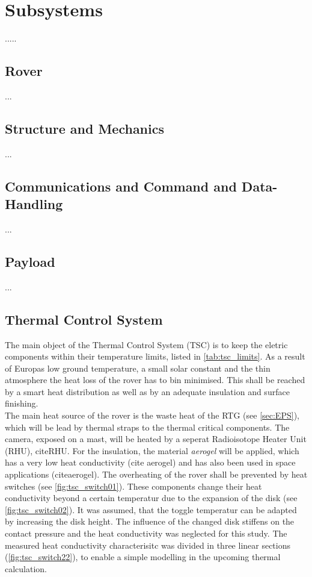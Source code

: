 \chapter{Subsystems}
\label{chap:subsystems}
.....



\section{Rover}
\label{sec:rover}
...
\section{Structure and Mechanics}
\label{sec:mechanics}
...
\section{Communications and Command and Data-Handling}
\label{sec:comm}
...
\section{Payload}
\label{sec:payload}
...
\clearpage
\section{Thermal Control System} \label{sec:thermalcontrol}
The main object of the Thermal Control System (TSC) is to keep the eletric components within their temperature limits, listed in \autoref{tab:tsc_limits}.
As a result of Europas low ground temperature, a small solar constant and the thin atmosphere the heat loss of the rover has to bin minimised.
This shall be reached by a smart heat distribution as well as by an adequate insulation and surface finishing.
\\
The main heat source of the rover is the waste heat of the RTG (see \autoref{sec:EPS}), which will be lead by thermal straps to the thermal critical components.
The camera, exposed on a mast, will be heated by a seperat Radioisotope Heater Unit (RHU), cite{RHU}. %
For the insulation, the material \textit{aerogel} will be applied, which has a very low heat conductivity (cite aerogel) and has also been used in space applications (cite{aerogel}).
The overheating of the rover shall be prevented by heat switches (see \autoref{fig:tsc_switch01}).
These components change their heat conductivity beyond a certain temperatur due to the expansion of the disk (see \autoref{fig:tsc_switch02}).
It was assumed, that the toggle temperatur can be adapted by increasing the disk height.
The influence of the changed disk stiffens on the contact pressure and the heat conductivity was neglected for this study.
The measured heat conductivity characterisitc was divided in three linear sections (\autoref{fig:tsc_switch22}), to enable a simple modelling in the upcoming thermal calculation.

